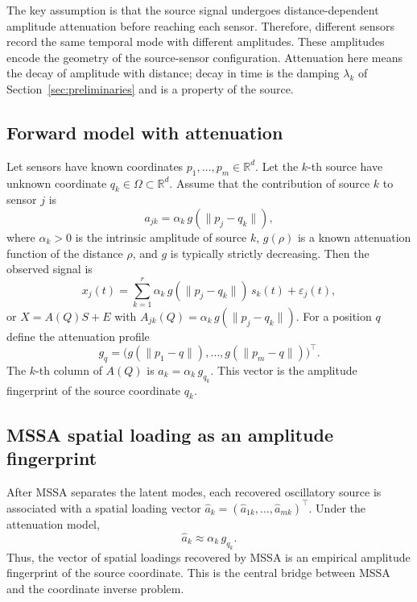 \documentclass{article}
\begin{document}
The key assumption is that the source signal undergoes distance-dependent amplitude attenuation before reaching each sensor. Therefore, different sensors record the same temporal mode with different amplitudes. These amplitudes encode the geometry of the source-sensor configuration. Attenuation here means the decay of amplitude with distance; decay in time is the damping $\lambda_k$ of Section~\ref{sec:preliminaries} and is a property of the source.

\subsection{Forward model with attenuation}\label{sec:forward-model-with-attenuation}

Let sensors have known coordinates $p_1, \dots, p_m \in \mathbb{R}^{d}$. Let the $k$-th source have unknown coordinate $q_k \in \Omega \subset \mathbb{R}^{d}$. Assume that the contribution of source $k$ to sensor $j$ is 
\begin{equation} \label{eq:attenuation}
a_{jk} = \alpha_k\, g(\lVert p_j - q_k \rVert),
\end{equation} where $\alpha_k > 0$ is the intrinsic amplitude of source $k$, $g(\rho)$ is a known attenuation function of the distance $\rho$, and $g$ is typically strictly decreasing. Then the observed signal is \[
x_j(t) = \sum_{k=1}^{r} \alpha_k\, g(\lVert p_j - q_k \rVert)\, s_k(t) + \varepsilon_j(t),
\] or $X = A(Q) S + E$ with $A_{jk}(Q) = \alpha_k\, g(\lVert p_j - q_k \rVert)$. For a position $q$ define the attenuation profile \[
g_q = \bigl(g(\lVert p_1 - q \rVert), \dots, g(\lVert p_m - q \rVert)\bigr)^{\top}.
\] The $k$-th column of $A(Q)$ is $a_k = \alpha_k\, g_{q_k}$. This vector is the amplitude fingerprint of the source coordinate $q_k$.

\subsection{MSSA spatial loading as an amplitude fingerprint}\label{sec:mssa-spatial-loading-as}

After MSSA separates the latent modes, each recovered oscillatory source is associated with a spatial loading vector $\widehat{a}_k = (\widehat{a}_{1k}, \dots, \widehat{a}_{mk})^{\top}$. Under the attenuation model, \[
\widehat{a}_k \approx \alpha_k\, g_{q_k}.
\] Thus, the vector of spatial loadings recovered by MSSA is an empirical amplitude fingerprint of the source coordinate. This is the central bridge between MSSA and the coordinate inverse problem.
\end{document}
